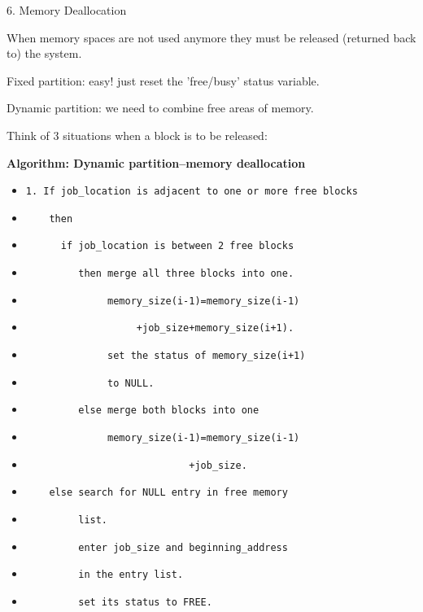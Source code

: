\begin{slide}{ 6. Memory Deallocation}
\item When memory spaces are not used anymore they must be released (returned
back to) the system.
\item Fixed partition: easy! just reset the 'free/busy' status variable.
\item Dynamic partition: we need to combine free areas of memory.
\item Think of 3 situations when a block is to be released:
\newpage
\item {\bf Algorithm: Dynamic partition--memory deallocation}
 \begin{itemize}
 \item {\tt 1. If job\_location is adjacent to one or more free blocks}
 \item {\tt ~~~~then}
 \item {\tt ~~~~~~if job\_location is between 2 free blocks}
 \item {\tt ~~~~~~~~~then merge all three blocks into one.}
 \item {\tt ~~~~~~~~~~~~~~memory\_size(i-1)=memory\_size(i-1)}
 \item {\tt ~~~~~~~~~~~~~~~~~~~+job\_size+memory\_size(i+1).}
 \item {\tt ~~~~~~~~~~~~~~set the status of memory\_size(i+1)}
 \item {\tt ~~~~~~~~~~~~~~to NULL.}
 \item {\tt ~~~~~~~~~else merge both blocks into one}
 \item {\tt ~~~~~~~~~~~~~~memory\_size(i-1)=memory\_size(i-1)}
 \item {\tt ~~~~~~~~~~~~~~~~~~~~~~~~~~~~+job\_size.}
 \item {\tt ~~~~else search for NULL entry in free memory}
 \item {\tt ~~~~~~~~~list.}
 \item {\tt ~~~~~~~~~enter job\_size and beginning\_address}
 \item {\tt ~~~~~~~~~in the entry list.}
 \item {\tt ~~~~~~~~~set its status to FREE.}
 \end{itemize}
\end{slide}

